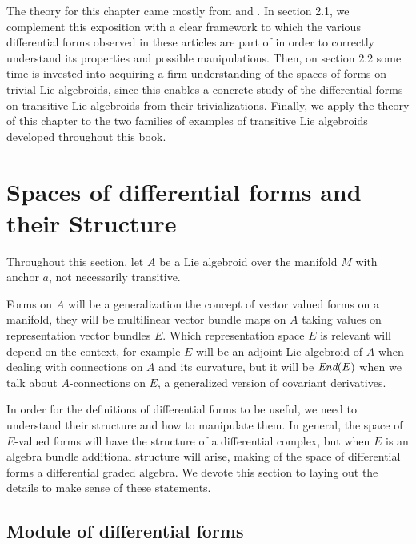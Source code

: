 The theory for this chapter came mostly from \cite{Lazzarini2012} and \cite{Fournel2011}. In section 2.1, we complement this exposition with a clear framework to which the various differential forms observed in these articles are part of in order to correctly understand its properties and possible manipulations. Then, on section 2.2 some time is invested into acquiring a firm understanding of the spaces of forms on trivial Lie algebroids, since this enables a concrete study of the differential forms on transitive Lie algebroids from their trivializations. Finally, we apply the theory of this chapter to the two families of examples of transitive Lie algebroids developed throughout this book.

\section{Spaces of differential forms and their Structure}
\label{ChFormsSectionTheory}

Throughout this section, let $A$ be a Lie algebroid over the manifold $M$ with anchor $a$, not necessarily transitive.

Forms on $A$ will be a generalization the concept of vector valued forms on a manifold, they will be multilinear vector bundle maps on $A$ taking values on representation vector bundles $E$. Which representation space $E$ is relevant will depend on the context, for example $E$ will be an adjoint Lie algebroid of $A$ when dealing with connections on $A$ and its curvature, but it will be $\operatorname{\textit{End}}(E)$ when we talk about $A$-connections on $E$, a generalized version of covariant derivatives.

In order for the definitions of differential forms to be useful, we need to understand their structure and how to manipulate them. In general, the space of $E$-valued forms will have the structure of a differential complex, but when $E$ is an algebra bundle additional structure will arise, making of the space of differential forms a differential graded algebra. We devote this section to laying out the details to make sense of these statements.

\subsection{Module of differential forms}

